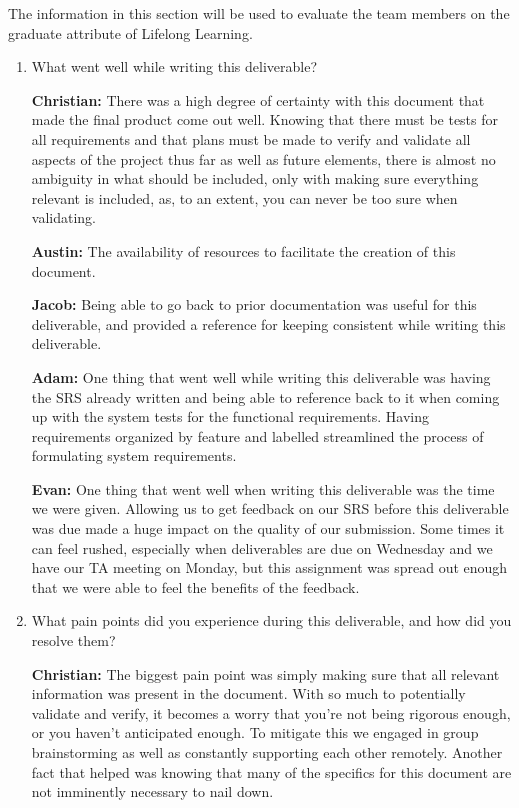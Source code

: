 \documentclass[12pt, titlepage]{article}
\begin{document}

The information in this section will be used to evaluate the team members on the
graduate attribute of Lifelong Learning.



\begin{enumerate}
  \item What went well while writing this deliverable? 

  \textbf{Christian:} There was a high degree of certainty with this document that made the final product come out well. Knowing that there must be tests for all requirements and that plans must be made to verify and validate all aspects of the project thus far as well as future elements, there is almost no ambiguity in what should be included, only with making sure everything relevant is included, as, to an extent, you can never be too sure when validating.
  
  \textbf{Austin:} The availability of resources to facilitate the creation of this document.
  
  \textbf{Jacob:} Being able to go back to prior documentation was useful for this deliverable, and provided a reference for keeping consistent while writing this deliverable.

  \textbf{Adam:} One thing that went well while writing this deliverable was having the SRS already written and being able to reference back to it when coming up with the system tests for the functional requirements. Having requirements organized by feature and labelled streamlined the process of formulating system requirements.

  \textbf{Evan: } One thing that went well when writing this deliverable was the time we were given. Allowing us to get feedback on our SRS before this deliverable was due made a huge impact on the quality of our submission. Some times it can feel rushed, especially when deliverables are due on Wednesday and we have our TA meeting on Monday, but this assignment was spread out enough that we were able to feel the benefits of the feedback.
  
  \item What pain points did you experience during this deliverable, and how
    did you resolve them?

  \textbf{Christian:} The biggest pain point was simply making sure that all relevant information was present in the document. With so much to potentially validate and verify, it becomes a worry that you're not being rigorous enough, or you haven't anticipated enough. To mitigate this we engaged in group brainstorming as well as constantly supporting each other remotely. Another fact that helped was knowing that many of the specifics for this document are not imminently necessary to nail down.
  

\end{enumerate}
\end{document}

